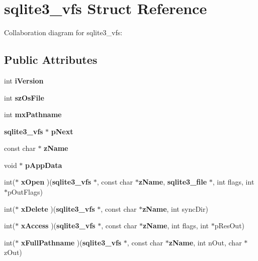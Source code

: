 \section{sqlite3\_\-vfs Struct Reference}
\label{structsqlite3__vfs}
Collaboration diagram for sqlite3\_\-vfs:\subsection*{Public Attributes}
\begin{CompactItemize}
\item 
int {\bf iVersion}\label{structsqlite3__vfs_1138620d71393e6105389670719d9685}

\item 
int {\bf szOsFile}\label{structsqlite3__vfs_96670e11731f3227851f651b807a63c8}

\item 
int {\bf mxPathname}\label{structsqlite3__vfs_04df9f08eb19e4567ea3899f8a938d5c}

\item 
{\bf sqlite3\_\-vfs} $\ast$ {\bf pNext}\label{structsqlite3__vfs_1df0afd6b472628ed51a8881efb07a61}

\item 
const char $\ast$ {\bf zName}\label{structsqlite3__vfs_b014fc02d99cc45050cdfcda485c780a}

\item 
void $\ast$ {\bf pAppData}\label{structsqlite3__vfs_1e6eda095a5b3e9fc4d6c3d88236a844}

\item 
int($\ast$ \textbf{xOpen} )({\bf sqlite3\_\-vfs} $\ast$, const char $\ast${\bf zName}, {\bf sqlite3\_\-file} $\ast$, int flags, int $\ast$pOutFlags)\label{structsqlite3__vfs_6cc44918b6646d3b005b0b04c01e3fe5}

\item 
int($\ast$ \textbf{xDelete} )({\bf sqlite3\_\-vfs} $\ast$, const char $\ast${\bf zName}, int syncDir)\label{structsqlite3__vfs_912173a4206a6fb4d7ae9e76420a8596}

\item 
int($\ast$ \textbf{xAccess} )({\bf sqlite3\_\-vfs} $\ast$, const char $\ast${\bf zName}, int flags, int $\ast$pResOut)\label{structsqlite3__vfs_bc25aba7356d962a9602b37f3b769001}

\item 
int($\ast$ \textbf{xFullPathname} )({\bf sqlite3\_\-vfs} $\ast$, const char $\ast${\bf zName}, int nOut, char $\ast$zOut)\label{structsqlite3__vfs_e25f89e6402cb0f9cb50eaafa663c7a1}


\end{CompactItemize}

